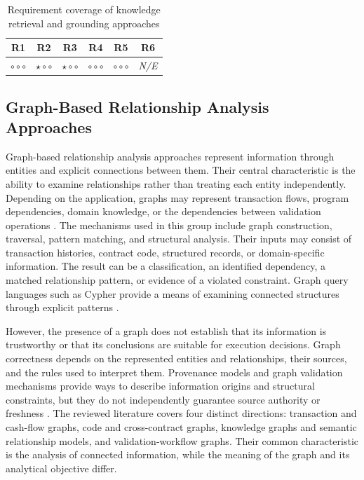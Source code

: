\begin{table}[H]
\centering
\renewcommand{\arraystretch}{1.3}
\begin{tabular}{cccccc}
\hline
\textbf{R1} & \textbf{R2} & \textbf{R3} &
\textbf{R4} & \textbf{R5} & \textbf{R6} \\
\hline

$\circ\circ\circ$ &
$\star\circ\circ$ &
$\star\circ\circ$ &
$\circ\circ\circ$ &
$\circ\circ\circ$ &
\textit{N/E} \\

\hline
\end{tabular}
\caption{Requirement coverage of knowledge retrieval
and grounding approaches}
\label{tab:req_knowledge_retrieval}
\end{table}





\subsection{Graph-Based Relationship Analysis Approaches}
\label{subsec:graph_structured_approaches}

Graph-based relationship analysis approaches represent
information through entities and explicit connections
between them. Their central characteristic is the
ability to examine relationships rather than treating
each entity independently. Depending on the application,
graphs may represent transaction flows, program
dependencies, domain knowledge, or the dependencies
between validation operations
\cite{hoganKnowledgeGraphs2021,
anglesPropertyGraphModel2018}. The mechanisms used in this group include graph construction,
traversal, pattern matching, and structural analysis. Their
inputs may consist of transaction histories, contract code,
structured records, or domain-specific information. The
result can be a classification, an identified dependency,
a matched relationship pattern, or evidence of a violated
constraint. Graph query languages such as Cypher provide
a means of examining connected structures through explicit
patterns \cite{francisCypher2018}.

However, the presence of a graph does not establish that
its information is trustworthy or that its conclusions
are suitable for execution decisions. Graph correctness
depends on the represented entities and relationships,
their sources, and the rules used to interpret them.
Provenance models and graph validation mechanisms provide
ways to describe information origins and structural
constraints, but they do not independently guarantee
source authority or freshness
\cite{w3cPROVO2013,w3cSHACL2017}. The reviewed literature covers four distinct directions:
transaction and cash-flow graphs, code and cross-contract
graphs, knowledge graphs and semantic relationship models,
and validation-workflow graphs. Their common characteristic
is the analysis of connected information, while the meaning
of the graph and its analytical objective differ.

